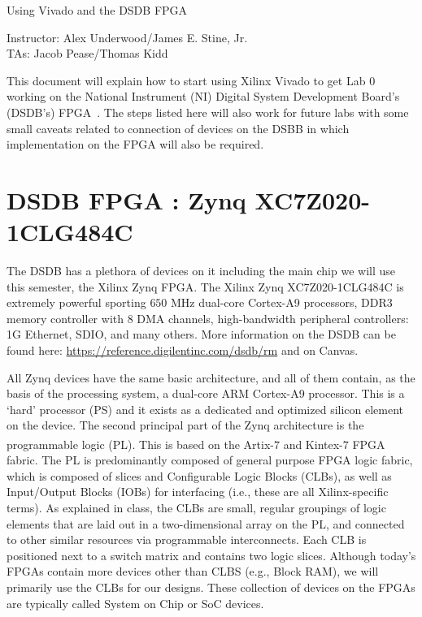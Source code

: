 \documentclass{article}
\newcommand{\myassignment}{Using Vivado and the DSDB FPGA}
\newcommand{\myinstructor}{Instructor: Alex Underwood/James E. Stine, Jr.}
\newcommand{\mytas}{TAs: Jacob Pease/Thomas Kidd}
\begin{document}
\begin{center}
  {\huge \myassignment} \\
  \begin{flushright}
    \myinstructor \\
    \mytas \\
  \end{flushright}
\end{center}

This document will explain how to start using Xilinx Vivado to get Lab 0
working on the National Instrument (NI) Digital System Development
Board's (DSDB's) FPGA~\cite{dsdb1}.  The steps listed here will also work for
future labs with some small caveats related to connection of devices
on the DSBB in which implementation on the FPGA will also be required.

\section{DSDB FPGA : Zynq XC7Z020-1CLG484C}

The DSDB has a plethora of devices on it including the main chip we
will use this semester, the Xilinx Zynq FPGA.  The Xilinx Zynq
XC7Z020-1CLG484C is extremely powerful sporting  $650$ MHz
dual-core Cortex-A9 processors,  DDR3 memory controller with $8$ DMA
channels,  high-bandwidth peripheral controllers: 1G Ethernet, SDIO,
and many others.  More information on the DSDB can be found here:
\url{https://reference.digilentinc.com/dsdb/rm} and on Canvas.

All Zynq devices have the same basic architecture, and all of them
contain, as the basis of
the processing system, a dual-core ARM Cortex-A9 processor. This is a
‘hard’ processor (PS) and
it exists as a dedicated and optimized silicon element on the device.
The second principal part of the Zynq architecture is the programmable
logic (PL). This is
based on the Artix\textsuperscript{\textregistered}-$7$ and
Kintex\textsuperscript{\textregistered}-$7$ FPGA fabric.
The PL is predominantly composed of general purpose FPGA logic fabric,
which is composed of slices and Configurable Logic Blocks (CLBs), as
well as Input/Output Blocks (IOBs) for interfacing 
(i.e., these are all Xilinx-specific terms).   As explained in class,
the CLBs are small, regular groupings of logic
elements that are laid out in a two-dimensional array on the PL, and
connected to
other similar resources via programmable interconnects.
Each CLB is positioned
next to a switch matrix and contains two logic slices.  Although
today's FPGAs contain more devices other than CLBS (e.g., Block RAM),
we will primarily use the CLBs for our designs.  These collection of
devices on the FPGAs are typically called System on Chip or SoC devices.
\end{document}
